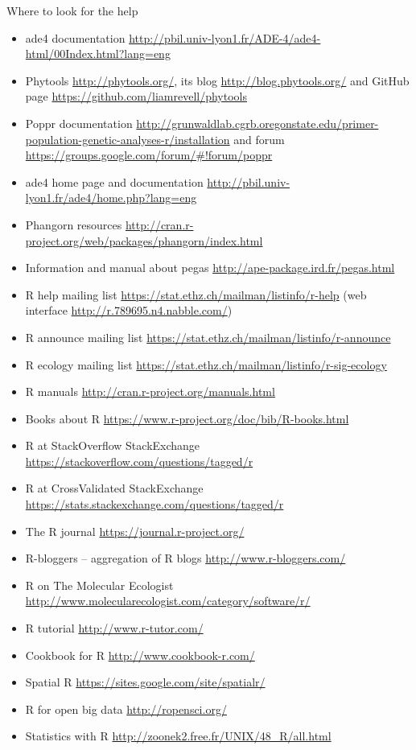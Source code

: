\documentclass[compress, ucs, xelatex, 11pt, xcolor=svgnames,
  hyperref={
    bookmarks=true,
    unicode=true,
    colorlinks=true,
    pdftitle={Molecular data in R},
    plainpages=false,
    pdfauthor={Vojtech Zeisek},
    pdfsubject={Course about phylogeny and evolution in R},
    pdfcreator={XeLaTeX},
    pdfkeywords={R, evolution, phylogeny, molecular data},
    linkcolor=Tomato,
    anchorcolor=SaddleBrown,
    citecolor=Goldenrod,
    filecolor=DarkMagenta,
    menucolor=Sienna,
    urlcolor=DarkTurquoise,
    pdftex},
  url={hyphens, lowtilde} %
  ]{beamer}
\begin{document}
\begin{frame}[allowframebreaks]{Where to look for the help}
\begin{itemize}
 \item ade4 documentation \url{http://pbil.univ-lyon1.fr/ADE-4/ade4-html/00Index.html?lang=eng}
 \item Phytools \url{http://phytools.org/}, its blog \url{http://blog.phytools.org/} and GitHub page \url{https://github.com/liamrevell/phytools}
 \item Poppr documentation \url{http://grunwaldlab.cgrb.oregonstate.edu/primer-population-genetic-analyses-r/installation} and forum \url{https://groups.google.com/forum/\#!forum/poppr}
 \item ade4 home page and documentation \url{http://pbil.univ-lyon1.fr/ade4/home.php?lang=eng}
 \item Phangorn resources \url{http://cran.r-project.org/web/packages/phangorn/index.html}
 \item Information and manual about pegas \url{http://ape-package.ird.fr/pegas.html}
 \item R help mailing list \url{https://stat.ethz.ch/mailman/listinfo/r-help} (web interface \url{http://r.789695.n4.nabble.com/})
 \item R announce mailing list \url{https://stat.ethz.ch/mailman/listinfo/r-announce}
 \item R ecology mailing list \url{https://stat.ethz.ch/mailman/listinfo/r-sig-ecology}
 \item R manuals \url{http://cran.r-project.org/manuals.html}
 \item Books about R \url{https://www.r-project.org/doc/bib/R-books.html}
 \item R at StackOverflow StackExchange \url{https://stackoverflow.com/questions/tagged/r}
 \item R at CrossValidated StackExchange \url{https://stats.stackexchange.com/questions/tagged/r}
 \item The R journal \url{https://journal.r-project.org/}
 \item R-bloggers -- aggregation of R blogs \url{http://www.r-bloggers.com/}
 \item R on The Molecular Ecologist \url{http://www.molecularecologist.com/category/software/r/}
 \item R tutorial \url{http://www.r-tutor.com/}
 \item Cookbook for R  \url{http://www.cookbook-r.com/}
 \item Spatial R \url{https://sites.google.com/site/spatialr/}
 \item R for open big data \url{http://ropensci.org/}
 \item Statistics with R \url{http://zoonek2.free.fr/UNIX/48_R/all.html}

\end{itemize}
\end{frame}
\end{document}
